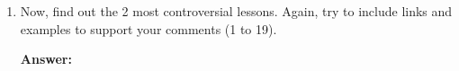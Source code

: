 \documentclass[11pt]{scrartcl}
\begin{document}
\begin{enumerate}
			\indent A sample of spread code could be \emph{Android SDK}\footnote{http://source.android.com/source/downloading.html}. I know, Google only release source code when he wants, but this is not the question, is how code release help your development increases capabilities, gets strong and it's used for more and more people and therefore your beta-tester 'database' increases everyday.
			
		\item Now, find out the 2 most controversial lessons. Again, try to include links and examples to support your comments (1 to 19).

			\textbf{Answer:}
	\end{enumerate}
\end{document}
